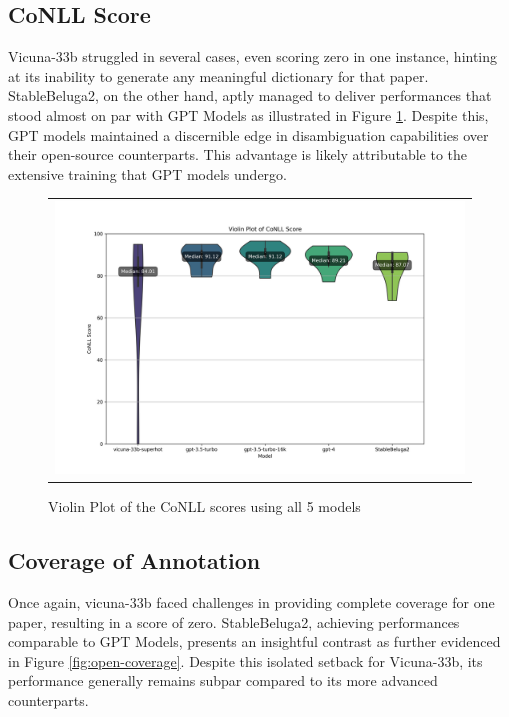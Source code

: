 \subsection{CoNLL Score}

Vicuna-33b struggled in several cases, even scoring zero in one instance, hinting at its inability to generate any meaningful dictionary for that paper. StableBeluga2, on the other hand, aptly managed to deliver performances that stood almost on par with GPT Models as illustrated in Figure \ref{fig:open-source-conll}. Despite this, GPT models maintained a discernible edge in disambiguation capabilities over their open-source counterparts. This advantage is likely attributable to the extensive training that GPT models undergo.

\begin{figure}[htpb]
  \centering
  \begin{tabular}{c}
  \includegraphics[width=14cm]{images/open-conll-score.png}
  \end{tabular}
  \caption[CoNLL Score Open Source]{Violin Plot of the CoNLL scores using all 5 models}\label{fig:open-source-conll}
\end{figure}

\subsection{Coverage of Annotation}

Once again, vicuna-33b faced challenges in providing complete coverage for one paper, resulting in a score of zero. StableBeluga2, achieving performances comparable to GPT Models, presents an insightful contrast as further evidenced in Figure \ref{fig:open-coverage}. Despite this isolated setback for Vicuna-33b, its performance generally remains subpar compared to its more advanced counterparts. 

